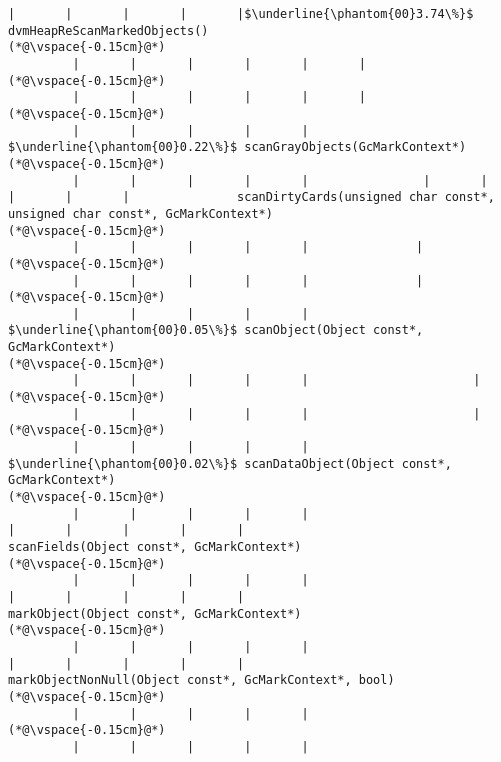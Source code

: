 \begin{lstlisting}[caption=NewDirectByteBuffer, label=profile:C2JNewDirectBuffer-512, numberbychapter=true, frame=lines, float, floatplacement=t]
         |       |       |       |       |$\underline{\phantom{00}3.74\%}$ dvmHeapReScanMarkedObjects()
(*@\vspace{-0.15cm}@*)
         |       |       |       |       |       |
(*@\vspace{-0.15cm}@*)
         |       |       |       |       |       |
(*@\vspace{-0.15cm}@*)
         |       |       |       |       |        $\underline{\phantom{00}0.22\%}$ scanGrayObjects(GcMarkContext*)
(*@\vspace{-0.15cm}@*)
         |       |       |       |       |                |       |       |       |       |               scanDirtyCards(unsigned char const*, unsigned char const*, GcMarkContext*)
(*@\vspace{-0.15cm}@*)
         |       |       |       |       |               |
(*@\vspace{-0.15cm}@*)
         |       |       |       |       |               |
(*@\vspace{-0.15cm}@*)
         |       |       |       |       |                $\underline{\phantom{00}0.05\%}$ scanObject(Object const*, GcMarkContext*)
(*@\vspace{-0.15cm}@*)
         |       |       |       |       |                       |
(*@\vspace{-0.15cm}@*)
         |       |       |       |       |                       |
(*@\vspace{-0.15cm}@*)
         |       |       |       |       |                        $\underline{\phantom{00}0.02\%}$ scanDataObject(Object const*, GcMarkContext*)
(*@\vspace{-0.15cm}@*)
         |       |       |       |       |                                |       |       |       |       |                               scanFields(Object const*, GcMarkContext*)
(*@\vspace{-0.15cm}@*)
         |       |       |       |       |                                |       |       |       |       |                               markObject(Object const*, GcMarkContext*)
(*@\vspace{-0.15cm}@*)
         |       |       |       |       |                                |       |       |       |       |                               markObjectNonNull(Object const*, GcMarkContext*, bool)
(*@\vspace{-0.15cm}@*)
         |       |       |       |       |
(*@\vspace{-0.15cm}@*)
         |       |       |       |       |

\end{lstlisting}

